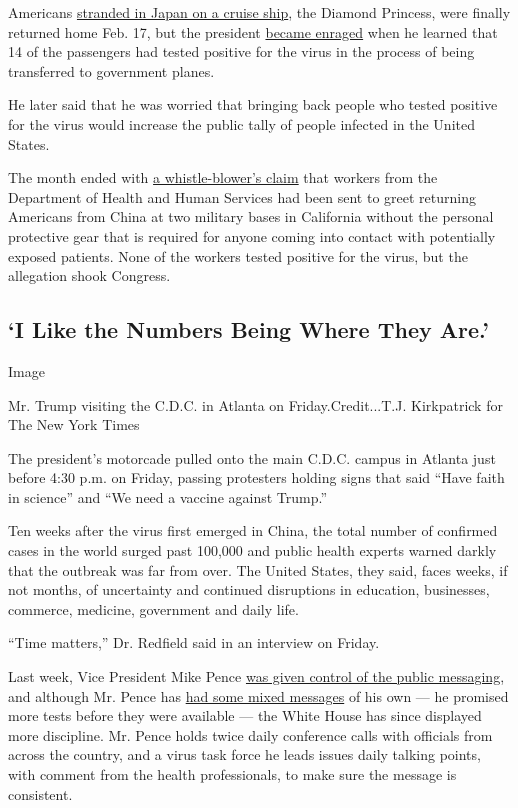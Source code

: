 Americans
\href{https://www.nytimes3xbfgragh.onion/2020/02/22/world/asia/coronavirus-japan-cruise-ship.html}{stranded
in Japan on a cruise ship}, the Diamond Princess, were finally returned
home Feb. 17, but the president
\href{https://www.nytimes3xbfgragh.onion/2020/02/22/us/politics/trump-coronavirus-cruise-ship.html}{became
enraged} when he learned that 14 of the passengers had tested positive
for the virus in the process of being transferred to government planes.

He later said that he was worried that bringing back people who tested
positive for the virus would increase the public tally of people
infected in the United States.

The month ended with
\href{https://www.nytimes3xbfgragh.onion/2020/02/27/us/politics/coronavirus-us-whistleblower.html}{a
whistle-blower's claim} that workers from the Department of Health and
Human Services had been sent to greet returning Americans from China at
two military bases in California without the personal protective gear
that is required for anyone coming into contact with potentially exposed
patients. None of the workers tested positive for the virus, but the
allegation shook Congress.

\hypertarget{i-like-the-numbers-being-where-they-are}{%
\subsection{`I Like the Numbers Being Where They
Are.'}\label{i-like-the-numbers-being-where-they-are}}

Image

Mr. Trump visiting the C.D.C. in Atlanta on Friday.Credit...T.J.
Kirkpatrick for The New York Times

The president's motorcade pulled onto the main C.D.C. campus in Atlanta
just before 4:30 p.m. on Friday, passing protesters holding signs that
said ``Have faith in science'' and ``We need a vaccine against Trump.''

Ten weeks after the virus first emerged in China, the total number of
confirmed cases in the world surged past 100,000 and public health
experts warned darkly that the outbreak was far from over. The United
States, they said, faces weeks, if not months, of uncertainty and
continued disruptions in education, businesses, commerce, medicine,
government and daily life.

``Time matters,'' Dr. Redfield said in an interview on Friday.

Last week, Vice President Mike Pence
\href{https://www.nytimes3xbfgragh.onion/2020/02/27/us/politics/us-coronavirus-pence.html}{was
given control of the public messaging}, and although Mr. Pence has
\href{https://www.nytimes3xbfgragh.onion/2020/03/06/us/politics/pence-trump-coronavirus.html}{had
some mixed messages} of his own --- he promised more tests before they
were available --- the White House has since displayed more discipline.
Mr. Pence holds twice daily conference calls with officials from across
the country, and a virus task force he leads issues daily talking
points, with comment from the health professionals, to make sure the
message is consistent.

